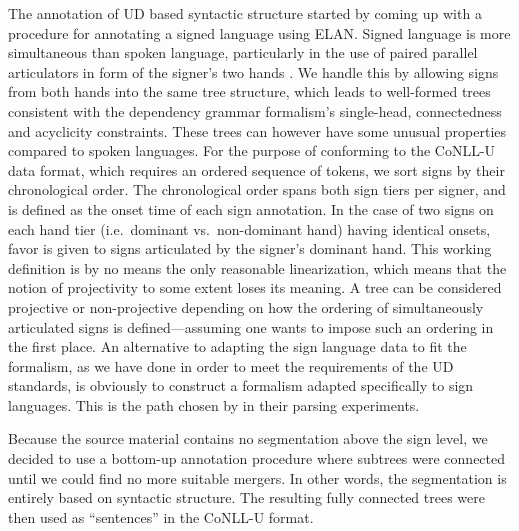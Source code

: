 \documentclass[11pt]{article}
\begin{document}
The annotation of UD based syntactic structure started by coming up with a procedure for annotating a signed language using ELAN. Signed language is more simultaneous than spoken language, particularly in the use of paired parallel articulators in form of the signer's two hands \cite{Vermeerbergen2007simultaneity}.
We handle this by allowing signs from both hands into the same tree structure,
which leads to well-formed trees consistent with the dependency grammar
formalism's single-head, connectedness and acyclicity constraints.
These trees can however have some unusual properties compared to spoken
languages.
For the purpose of conforming to the CoNLL-U data format,
which requires an ordered sequence of tokens, we sort
signs by their chronological order. The chronological order spans both sign tiers per signer, and is defined as the onset time of each sign annotation. In the case of two signs on each hand tier (i.e.~dominant vs.~non-dominant hand) having identical onsets, favor is given to signs articulated by the
signer's dominant hand.
This working definition is by no means the only reasonable linearization,
which means that the notion of projectivity to some extent loses its meaning.
A tree can be considered projective or non-projective depending on how the
ordering of simultaneously articulated signs is defined---assuming one wants
to impose such an ordering in the first place.
An alternative to adapting the sign language data to fit the formalism,
as we have done in order to meet the requirements of the UD standards,
is obviously to construct a formalism adapted specifically to sign languages.
This is the path chosen by  in their parsing
experiments.

Because the source material contains no segmentation above the sign level,
we decided to use a bottom-up annotation procedure where subtrees were
connected until we could find no more suitable mergers. In other words,
the segmentation is entirely based on syntactic structure. The resulting fully
connected trees were then used as ``sentences'' in the CoNLL-U format.
\end{document}
